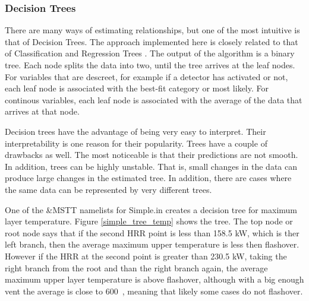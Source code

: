 \documentclass[12pt,twoside]{book}
\begin{document}
\subsubsection{Decision Trees}

There are many ways of estimating relationships, but one of the most intuitive is that of Decision Trees. The approach implemented here is closely related to that of Classification and Regression Trees \cite{Haste_2009}. The output of the algorithm is a binary tree. Each node splits the data into two, until the tree arrives at the leaf nodes. For variables that are descreet, for example if a detector has activated or not, each leaf node is associated with the best-fit category or most likely. For continous variables, each leaf node is associated with the average of the data that arrives at that node.

Decision trees have the advantage of being very easy to interpret. Their interpretability is one reason for their popularity. Trees have a couple of drawbacks as well. The most noticeable is that their predictions are not smooth. In addition, trees can be highly unstable. That is, small changes in the data can produce large changes in the estimated tree. In addition, there are cases where the same data can be represented by very different trees.

One of the {\ct \&MSTT} namelists for Simple.in creates a decision tree for maximum layer temperature. Figure \ref{simple_tree_temp} shows the tree. The top node or root node says that if the second HRR point is less than 158.5 kW, which is ther left branch, then the average maximum upper temperature is less then flashover. However if the HRR at the second point is greater than 230.5 kW, taking the right branch from the root and than the right branch again, the average maximum upper layer temperature is above flashover, although with a big enough vent the average is close to 600~\degc, meaning that likely some cases do not flashover.
\end{document}
